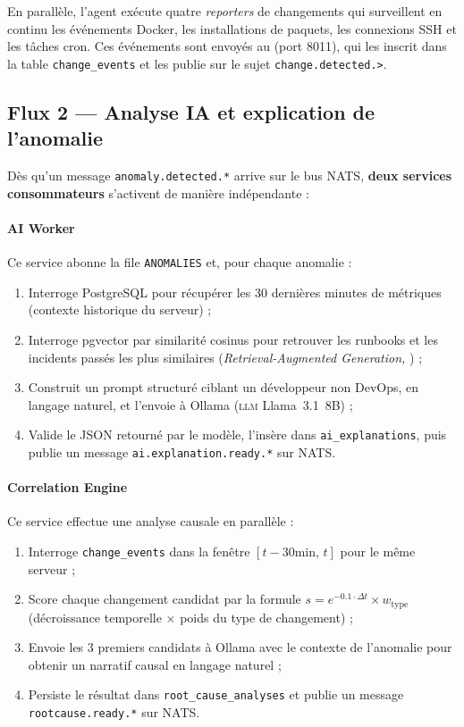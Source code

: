En parallèle, l'agent exécute quatre \textit{reporters} de changements
qui surveillent en continu les événements Docker, les installations de paquets,
les connexions SSH et les tâches cron. Ces événements sont envoyés au
 (port 8011), qui les inscrit dans la table
\texttt{change\_events} et les publie sur le sujet \texttt{change.detected.>}.

\subsection{Flux 2 — Analyse IA et explication de l'anomalie}

Dès qu'un message \texttt{anomaly.detected.*} arrive sur le bus NATS,
\textbf{deux services consommateurs} s'activent de manière indépendante :

\paragraph{AI Worker} Ce service abonne la file \texttt{ANOMALIES} et, pour
chaque anomalie :

\begin{enumerate}
  \item Interroge PostgreSQL pour récupérer les 30 dernières minutes de métriques
        (contexte historique du serveur) ;
  \item Interroge pgvector par similarité cosinus pour retrouver les runbooks et
        les incidents passés les plus similaires (\textit{Retrieval-Augmented
        Generation, \rag{}}) ;
  \item Construit un prompt structuré ciblant un développeur non DevOps, en
        langage naturel, et l'envoie à Ollama (\textsc{llm} Llama~3.1~8B) ;
  \item Valide le JSON retourné par le modèle, l'insère dans
        \texttt{ai\_explanations}, puis publie un message
        \texttt{ai.explanation.ready.*} sur NATS.
\end{enumerate}

\paragraph{Correlation Engine} Ce service effectue une analyse causale en
parallèle :

\begin{enumerate}
  \item Interroge \texttt{change\_events} dans la fenêtre $[t-30\text{min},\,t]$
        pour le même serveur ;
  \item Score chaque changement candidat par la formule
        $s = e^{-0.1 \cdot \Delta t} \times w_{\text{type}}$
        (décroissance temporelle × poids du type de changement) ;
  \item Envoie les 3 premiers candidats à Ollama avec le contexte de l'anomalie
        pour obtenir un narratif causal en langage naturel ;
  \item Persiste le résultat dans \texttt{root\_cause\_analyses} et publie un
        message \texttt{rootcause.ready.*} sur NATS.
\end{enumerate}

